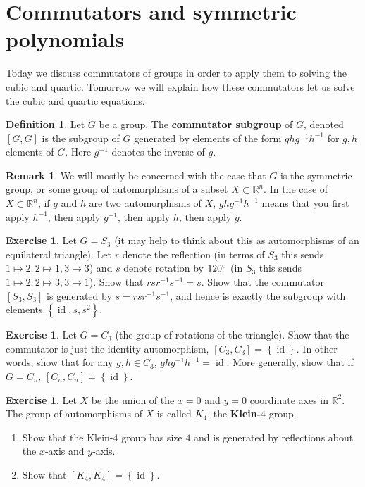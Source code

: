 \documentclass[reqno, 12pt, letter]{article}
\theoremstyle{plain}
\theoremstyle{definition}
\newtheorem{definition}[theorem]{Definition}
\newtheorem{remark}[theorem]{Remark}
\newtheorem{exercise}[theorem]{Exercise}
\theoremstyle{remark}
\numberwithin{equation}{section}
\newcommand\br{{\mathbb R}}
\DeclareMathOperator\id{id}
\begin{document}
\newpage
\section{Commutators and symmetric polynomials}
Today we discuss commutators of groups in order to apply them to solving the cubic and quartic.
Tomorrow we will explain how these commutators let us solve the cubic and quartic equations.
\begin{definition}
	\label{definition:}
	Let $G$ be a group. The {\bf commutator subgroup} of $G$, denoted $\left[ G,G \right]$ is the subgroup of $G$ generated 
	by elements of the form $ghg^{-1}h^{-1}$ for $g, h$ elements of $G$.
	Here $g^{-1}$ denotes the inverse of $g$.
\end{definition}
\begin{remark}
	\label{remark:}
	We will mostly be concerned with the case that $G$ is the symmetric group, or some group of automorphisms of a subset $X \subset \br^n$.
	In the case of $X \subset \br^n$, if $g$ and $h$ are two automorphisms of $X$, $ghg^{-1}h^{-1}$ means that you first apply $h^{-1}$, then apply $g^{-1}$, then
	apply $h$, then apply $g$.
\end{remark}
\begin{exercise}
	\label{exercise:}
	Let $G = S_3$ (it may help to think about this as automorphisms of an equilateral triangle).
	Let $r$ denote the reflection (in terms of $S_3$ this sends $1 \mapsto 2, 2 \mapsto 1, 3\mapsto 3$)
	and $s$ denote rotation by $120 \degree$ (in $S_3$ this sends $1 \mapsto 2, 2 \mapsto 3, 3 \mapsto 1$).
	Show that $rsr^{-1}s^{-1} = s$.
	Show that the commutator $\left[ S_3, S_3 \right]$ is generated by $s = rsr^{-1}s^{-1}$, and hence is exactly the subgroup
	with elements $\left\{ \id, s, s^2 \right\}$.
\end{exercise}
\begin{exercise}
	\label{exercise:}
	Let $G = C_3$ (the group of rotations of the triangle). Show that the commutator is just the identity automorphism, $\left[ C_3, C_3 \right] = \left\{ \id \right\}$.
	In other words, show that for any $g, h \in C_3$, $ghg^{-1}h^{-1} = \id$.
	More generally, show that if $G = C_n$, $\left[ C_n, C_n \right] = \left\{ \id \right\}$.
\end{exercise}

\begin{exercise}
	\label{exercise:klein-4}
	Let $X$ be the union of the $x = 0$ and $y = 0$ coordinate axes in $\br^2$. The group of automorphisms of $X$ is called $K_4$, the {\bf Klein-$4$} group.
	\begin{enumerate}
		\item Show that the Klein-$4$ group has size $4$ and is generated by reflections about the $x$-axis and $y$-axis.
		\item Show that $\left[ K_4, K_4 \right] = \left\{ \id \right\}$.
	\end{enumerate}
\end{exercise}
\end{document}
